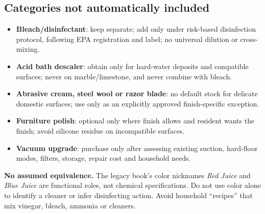 \documentclass[10pt,letterpaper,oneside]{article}
\begin{document}
\subsection{Categories not automatically included}
\begin{itemize}
\item \textbf{Bleach/disinfectant}: keep separate; add only under risk-based disinfection protocol, following EPA registration and label; no universal dilution or cross-mixing.
\item \textbf{Acid bath descaler}: obtain only for hard-water deposits and compatible surfaces; never on marble/limestone, and never combine with bleach.
\item \textbf{Abrasive cream, steel wool or razor blade}: no default stock for delicate domestic surfaces; use only as an explicitly approved finish-specific exception.
\item \textbf{Furniture polish}: optional only where finish allows and resident wants the finish; avoid silicone residue on incompatible surfaces.
\item \textbf{Vacuum upgrade}: purchase only after assessing existing suction, hard-floor modes, filters, storage, repair cost and household needs.
\end{itemize}
\begin{safetybox}\textbf{No assumed equivalence.} The legacy book's color nicknames \emph{Red Juice} and \emph{Blue Juice} are functional roles, not chemical specifications. Do not use color alone to identify a cleaner or infer disinfecting action. Avoid household ``recipes'' that mix vinegar, bleach, ammonia or cleaners.\end{safetybox}
\end{document}
